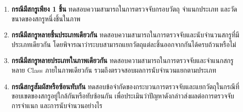 \begin{enumerate}        
    \item \textbf{กรณีมีสกรูเพียง 1 ชิ้น} ทดสอบความสามารถในการตรวจจับกรอบวัตถุ จำแนกประเภท และวัดขนาดของสกรูหนึ่งชิ้นในภาพ
    \item \textbf{กรณีมีสกรูหลายชิ้นประเภทเดียวกัน} ทดสอบความสามารถในการตรวจจับและนับจำนวนสกรูที่มีประเภทเดียวกัน โดยพิจารณาว่าระบบสามารถแยกวัตถุแต่ละชิ้นออกจากกันได้ครบถ้วนหรือไม่
    \item \textbf{กรณีมีสกรูหลายประเภทในภาพเดียวกัน} ทดสอบความสามารถในการตรวจจับและจำแนกสกรูหลาย Class ภายในภาพเดียวกัน รวมถึงตรวจสอบผลการนับจำนวนแยกตามประเภท
    \item \textbf{กรณีสกรูสัมผัสหรือซ้อนทับกัน} ทดสอบข้อจำกัดของกระบวนการตรวจจับและแยกวัตถุในกรณีที่ขอบเขตของสกรูอยู่ใกล้กันหรือทับซ้อนกัน เพื่อประเมินว่าปัญหาดังกล่าวส่งผลต่อการตรวจจับ การจำแนก และการนับจำนวนอย่างไร
\end{enumerate}